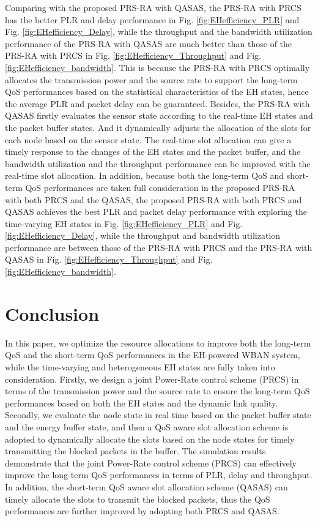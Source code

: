\documentclass[journal,10pt]{IEEEtran}
\begin{document}
Comparing with the proposed PRS-RA with QASAS, the PRS-RA with PRCS has the better PLR and delay performance in Fig. \ref{fig:EHefficiency_PLR} and Fig. \ref{fig:EHefficiency_Delay}, while the throughput and the bandwidth utilization performance of the PRS-RA with QASAS are much better than those of the PRS-RA with PRCS in Fig. \ref{fig:EHefficiency_Throughput} and Fig. \ref{fig:EHefficiency_bandwidth}. This is because the PRS-RA with PRCS optimally allocates the transmission power and the source rate to support the long-term QoS performances based on the statistical characteristics of the EH states, hence the average PLR and packet delay can be guaranteed. Besides, the PRS-RA with QASAS firstly evaluates the sensor state according to the real-time EH states and the packet buffer states. And it dynamically adjusts the allocation of the slots for each node based on the sensor state. The real-time slot allocation can give a timely response to the changes of the EH states and the packet buffer, and the bandwidth utilization and the throughput performance can be improved with the real-time slot allocation.
In addition, because both the long-term QoS and short-term QoS performances are taken full consideration in the proposed PRS-RA with both PRCS and the QASAS, the proposed PRS-RA with both PRCS and QASAS achieves the best PLR and packet delay performance with exploring the time-varying EH states in Fig. \ref{fig:EHefficiency_PLR} and Fig. \ref{fig:EHefficiency_Delay}, while the throughput and bandwidth utilization performance are between those of the PRS-RA with PRCS and the PRS-RA with QASAS in Fig. \ref{fig:EHefficiency_Throughput} and Fig. \ref{fig:EHefficiency_bandwidth}.


\renewcommand\arraystretch{1.2}


\section{Conclusion} \label{sec:conclusion}
In this paper, we optimize the resource allocations to improve both the long-term QoS and the short-term QoS performances in the EH-powered WBAN system, while the time-varying and heterogeneous EH states are fully taken into consideration. Firstly, we design a joint Power-Rate control scheme (PRCS) in terms of the transmission power and the source rate to ensure the long-term QoS performances based on both the EH states and the dynamic link quality. Secondly, we evaluate the node state in real time based on the packet buffer state and the energy buffer state, and then a QoS aware slot allocation scheme is adopted to dynamically allocate the slots based on the node states for timely transmitting the blocked packets in the buffer. The simulation results demonstrate that the joint Power-Rate control
scheme (PRCS) can effectively improve the long-term QoS performances in terms of PLR, delay and throughput. In addition, the short-term QoS aware slot allocation scheme (QASAS) can timely allocate the slots to transmit the blocked packets, thus the QoS performances are further improved by adopting both PRCS and QASAS.
\end{document}
